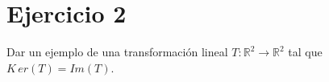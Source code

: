 \section*{Ejercicio 2}

Dar un ejemplo de una transformación lineal $T: \mathbb{R}^{2} \rightarrow \mathbb{R}^{2}$ tal que
$K\,er(T) = Im(T)$.

